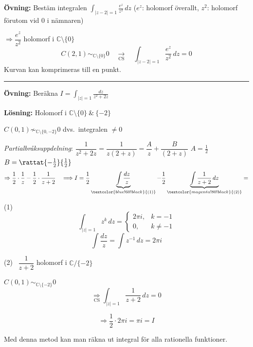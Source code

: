 \textbf{Övning:} Bestäm integralen $\displaystyle\int_{|z - 2| = 1} \frac{e^z}{z^2}\,dz$ \quad \textcolor{magenta!80!black}{($e^z$: holomorf överallt, $z^2$: holomorf förutom vid $0$ i nämnaren)}

$\Rightarrow \dfrac{e^z}{z^2}$ holomorf i $\mathbb{C} \setminus \{0\}$
\[ C(2, 1) \sim_{\mathbb{C} \setminus \{0\}} 0 \quad \xrightarrow[\text{CS}]{} \quad \int_{|z - 2| = 1} \frac{e^z}{z^2}\,dz = 0 \]
\textcolor{magenta!80!black}{Kurvan kan komprimeras till en punkt.}

\noindent\rule{\linewidth}{0.4pt}

\textbf{Övning:} Beräkna $I = \displaystyle\int_{|z| = 1} \frac{dz}{z^2 + 2z}$

\textbf{Lösning:}
Holomorf i $\mathbb{C} \setminus \{0\} \ \& \ \{-2\}$

$C(0, 1) \not\sim_{\mathbb{C} \setminus \{0, -2\}} 0$ \quad dvs.\ integralen $\neq 0$

\emph{Partialbråksuppdelning}: $\dfrac{1}{z^2 + 2z} = \dfrac{1}{z(2 + z)} = \dfrac{A}{z} + \dfrac{B}{(2 + z)}$ \quad $A = \frac{1}{2}$ \ $B = \rattat{-\frac{1}{2}}{\frac{1}{2}}$
\[ \Rightarrow \frac{1}{2} \cdot \frac{1}{z} - \frac{1}{2} \cdot \frac{1}{z + 2} \quad \Longrightarrow I = \frac{1}{2}\underbrace{\int \frac{dz}{z}}_{\textcolor{blue!60!black}{(1)}} - \frac{1}{2}\underbrace{\int \frac{1}{z + 2}\,dz}_{\textcolor{magenta!80!black}{(2)}} = \]

\begin{minipage}[t]{0.48\linewidth}
\textcolor{blue!60!black}{(1)} \ \textcolor{red!70!black}{}
\[ \int_{|z| = 1} z^k\,dz = \begin{cases} 2\pi i, & k = -1 \\ 0, & k \neq -1 \end{cases} \]
\[ \int \frac{dz}{z} = \int z^{-1}\,dz = 2\pi i \]
\end{minipage}\hfill\vrule\hfill
\begin{minipage}[t]{0.45\linewidth}
\textcolor{magenta!80!black}{(2)} \ $\dfrac{1}{z + 2}$ holomorf i $\mathbb{C} / \{-2\}$

$C(0, 1) \sim_{\mathbb{C} \setminus \{-2\}} 0$
\[ \underset{\text{CS}}{\Rightarrow} \int_{|z| = 1} \frac{1}{z + 2}\,dz = 0 \]
\end{minipage}

\[ \Longrightarrow \frac{1}{2} \cdot 2\pi i = \pi i = I \]

Med denna metod kan man räkna ut integral för alla rationella funktioner.

